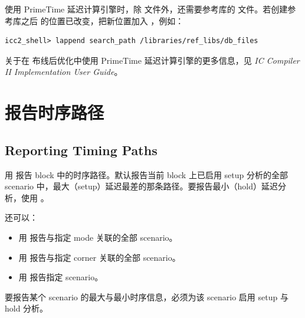 使用 PrimeTime 延迟计算引擎时，除  文件外，还需要参考库的  文件。若创建参考库之后  的位置已改变，把新位置加入 ，例如：
\begin{lstlisting}
icc2_shell> lappend search_path /libraries/ref_libs/db_files
\end{lstlisting}

关于在  布线后优化中使用 PrimeTime 延迟计算引擎的更多信息，见 \textit{IC Compiler II Implementation User Guide}。

\section{报告时序路径}
\subsection*{Reporting Timing Paths}

用  报告 block 中的时序路径。默认报告当前 block 上已启用 setup 分析的全部 scenario 中，最大（setup）延迟最差的那条路径。要报告最小（hold）延迟分析，使用 。

还可以：
\begin{itemize}
  \item 用  报告与指定 mode 关联的全部 scenario。
  \item 用  报告与指定 corner 关联的全部 scenario。
  \item 用  报告指定 scenario。
\end{itemize}

要报告某个 scenario 的最大与最小时序信息，必须为该 scenario 启用 setup 与 hold 分析。


